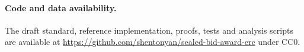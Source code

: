\documentclass[11pt]{article}
\theoremstyle{definition}
\theoremstyle{remark}
\begin{document}
\paragraph{Code and data availability.} The draft standard, reference implementation, proofs, tests and analysis scripts are available at \url{https://github.com/shentonyan/sealed-bid-award-erc} under CC0.



\end{document}
